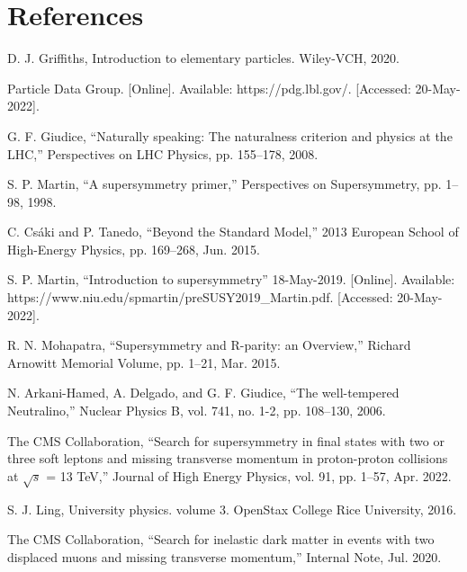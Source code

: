 \documentclass{article}
\begin{document}
\section{References}


\medskip 
\par \noindent
[1] D. J. Griffiths, Introduction to elementary particles. Wiley-VCH, 2020. \\
\par \noindent
[2] Particle Data Group. [Online]. Available: https://pdg.lbl.gov/. [Accessed: 20-May-2022]. \\
\par\noindent
[3] G. F. Giudice, “Naturally speaking: The naturalness criterion and physics at the LHC,” Perspectives on LHC Physics, pp. 155–178, 2008. \\
\par \noindent
[4] S. P. Martin, “A supersymmetry primer,” Perspectives on Supersymmetry, pp. 1–98, 1998. \\
\par \noindent
[5] C. Csáki and P. Tanedo, “Beyond the Standard Model,” 2013 European School of High-Energy Physics, pp. 169–268, Jun. 2015. \\
\par \noindent
[6] S. P. Martin, “Introduction to supersymmetry” 18-May-2019. [Online]. Available: https://www.niu.edu/spmartin/preSUSY2019\_Martin.pdf. [Accessed: 20-May-2022]. \\
\par \noindent
[7] R. N. Mohapatra, “Supersymmetry and R-parity: an Overview,” Richard Arnowitt Memorial Volume, pp. 1–21, Mar. 2015. \\
\par \noindent
[8] N. Arkani-Hamed, A. Delgado, and G. F. Giudice, “The well-tempered Neutralino,” Nuclear Physics B, vol. 741, no. 1-2, pp. 108–130, 2006. \\
\par \noindent
[9] The CMS Collaboration, “Search for supersymmetry in final states with two or three soft leptons and missing transverse momentum in proton-proton collisions at $\sqrt{s}$ = 13 TeV,” Journal of High Energy Physics, vol. 91, pp. 1–57, Apr. 2022. \\
\par \noindent
[10] S. J. Ling, University physics. volume 3. OpenStax College Rice University, 2016. \\
\par \noindent
[11] The CMS Collaboration, “Search for inelastic dark matter in events with two displaced muons and missing transverse momentum,” Internal Note, Jul. 2020. \\
\end{document}
